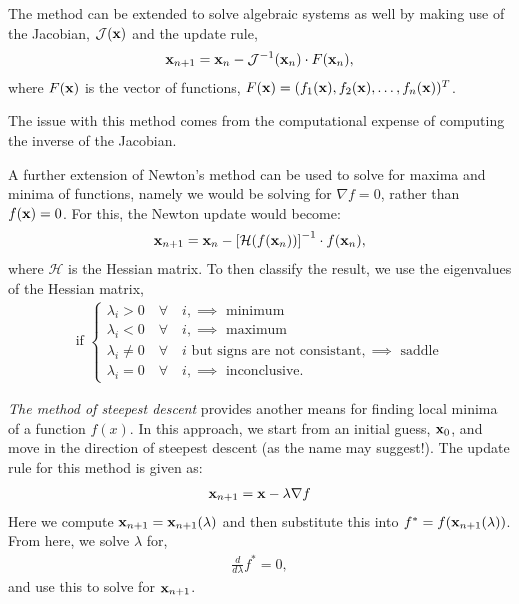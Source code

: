 \documentclass[11pt,a4paper]{report}
\begin{document}
		The method can be extended to solve algebraic systems as well by making use of the Jacobian, $\mathcal{J}(\mathbf{x})$ and the update rule,
		\begin{align}
			\mathbf{x}_{n+1} = \mathbf{x}_n - \mathcal{J}^{-1}(\mathbf{x}_n) \cdot F(\mathbf{x}_n),
		\end{align}
		where $F(\mathbf{x})$ is the vector of functions, $F(\mathbf{x})=(f_1(\mathbf{x}), f_2(\mathbf{x}),\dots,f_n(\mathbf{x}))^T$.
		
		The issue with this method comes from the computational expense of computing the inverse of the Jacobian. 
		
		A further extension of Newton's method can be used to solve for maxima and minima of functions, namely we would be solving for $\nabla f = 0$, rather than $f(\mathbf{x})=0$. For this, the Newton update would become:
		\begin{align}
			\mathbf{x}_{n+1} = \mathbf{x}_n - \left[\mathcal{H}(f(\mathbf{x}_n))\right]^{-1} \cdot f(\mathbf{x}_n),
		\end{align}
		where $\mathcal{H}$ is the Hessian matrix. To then classify the result, we use the eigenvalues of the Hessian matrix,
		\begin{align}
			\text{if } \begin{cases}
				\lambda_i > 0 \quad \forall \quad i, \implies \text{ minimum} \\
				\lambda_i < 0 \quad \forall \quad i, \implies \text{ maximum} \\
				\lambda_i \neq 0 \quad \forall \quad i \text{ but signs are not consistant}, \implies \text{ saddle} \\
				\lambda_i = 0 \quad \forall \quad i, \implies \text{ inconclusive.} 
			\end{cases}
		\end{align}
		
		\textit{The method of steepest descent} provides another means for finding local minima of a function $f(x)$. In this approach, we start from an initial guess, $\mathbf{x}_0$, and move in the direction of steepest descent (as the name may suggest!). The update rule for this method is given as:
		\begin{align}
			\mathbf{x}_{n+1} = \mathbf{x} - \lambda \nabla f
		\end{align}
		Here we compute $\mathbf{x}_{n+1} = \mathbf{x}_{n+1}(\lambda)$ and then substitute this into $f^*=f(\mathbf{x}_{n+1}(\lambda))$. From here, we solve $\lambda$ for, 
		\begin{align}
			\frac{d}{d\lambda} f^* = 0,
		\end{align}
		and use this to solve for $\mathbf{x}_{n+1}$.
		
\end{document}
